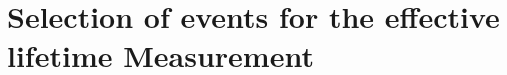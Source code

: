 \chapter{Selection of \bsmumu events for the effective lifetime Measurement}
\label{selection_chapter}
